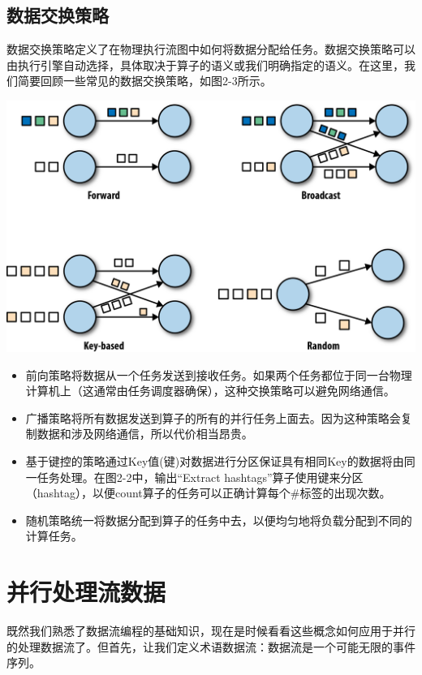 \documentclass[oneside]{ctexbook}
\begin{document}
\subsection{数据交换策略}

数据交换策略定义了在物理执行流图中如何将数据分配给任务。数据交换策略可以由执行引擎自动选择，具体取决于算子的语义或我们明确指定的语义。在这里，我们简要回顾一些常见的数据交换策略，如图2-3所示。

\noindent\includegraphics[width=\textwidth]{spaf_0203.png}

\begin{itemize}
  \item 前向策略将数据从一个任务发送到接收任务。如果两个任务都位于同一台物理计算机上（这通常由任务调度器确保），这种交换策略可以避免网络通信。
  \item 广播策略将所有数据发送到算子的所有的并行任务上面去。因为这种策略会复制数据和涉及网络通信，所以代价相当昂贵。
  \item 基于键控的策略通过Key值(键)对数据进行分区保证具有相同Key的数据将由同一任务处理。在图2-2中，输出“Extract hashtags”算子使用键来分区（hashtag），以便count算子的任务可以正确计算每个\#标签的出现次数。
  \item 随机策略统一将数据分配到算子的任务中去，以便均匀地将负载分配到不同的计算任务。
\end{itemize}

\section{并行处理流数据}

既然我们熟悉了数据流编程的基础知识，现在是时候看看这些概念如何应用于并行的处理数据流了。但首先，让我们定义术语数据流：数据流是一个可能无限的事件序列。
\end{document}
